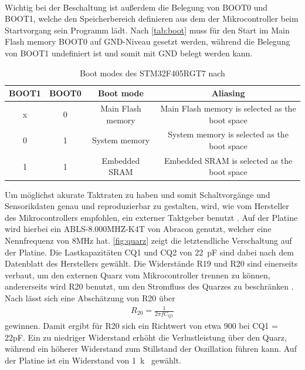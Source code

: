 \noindent\begin{minipage}{0.75\textwidth}
\label{fig:mcupin}
\end{minipage}
\noindent\begin{minipage}{0.2\textwidth}
	\label{tab:pins}
\end{minipage}
\hspace{1cm}
\newline
\\
Wichtig bei der Beschaltung ist außerdem die Belegung von BOOT0 und BOOT1, welche den Speicherbereich definieren aus dem der Mikrocontroller beim Startvorgang sein Programm lädt. Nach \autoref{tab:boot} muss für den Start im Main Flash memory BOOT0 auf GND-Niveau gesetzt werden, während die Belegung von BOOT1 undefiniert ist und somit mit GND belegt werden kann.

\begin{table}[H]%
\centering
\begin{tabular}{c c c c}
BOOT1 & BOOT0 & Boot mode & Aliasing \\ \hline
x & 0 & Main Flash memory & Main Flash memory is selected as the boot space\\
0 & 1 & System memory & System memory is selected as the boot space\\
1 & 1 & Embedded SRAM & Embedded SRAM is selected as the boot space
\end{tabular}
\caption{Boot modes des STM32F405RGT7 nach \cite[S.69]{stmref}}
\label{tab:boot}
\end{table}

Um möglichst akurate Taktraten zu haben und somit Schaltvorgänge und Sensorikdaten genau und reproduzierbar zu gestalten, wird, wie vom Hersteller des Mikrocontrollers empfohlen, ein externer Taktgeber benutzt \cite[S.218]{stmref}. Auf der Platine wird hierbei ein ABLS-8.000MHZ-K4T von Abracon genutzt, welcher eine Nennfrequenz von 8MHz hat. \autoref{fig:quarz} zeigt die letztendliche Verschaltung auf der Platine. Die Lastkapazitäten CQ1 und CQ2 von \SI{22}{pF} sind dabei nach dem Datenblatt des Herstellers gewählt. Die Widerstände R19 und R20 sind einerseits verbaut, um den externen Quarz vom Mikrocontroller trennen zu können, andererseits wird R20 benutzt, um den Stromfluss des Quarzes zu beschränken \cite[S.16]{stmquarz}. Nach \cite[S.16]{stmquarz} lässt sich eine Abschätzung von R20 über
\begin{align*}
R_{20} = \frac{1}{2\pi f C_{Q1}}
\end{align*}
gewinnen. Damit ergibt für R20 sich ein Richtwert von etwa \SI{900}{\Omega} bei CQ1 = 22pF. Ein zu niedriger Widerstand erhöht die Verlustleistung über den Quarz, während ein höherer Widerstand zum Stillstand der Oszillation führen kann. Auf der Platine ist ein Widerstand von \SI{1}{k\Omega} gewählt.

